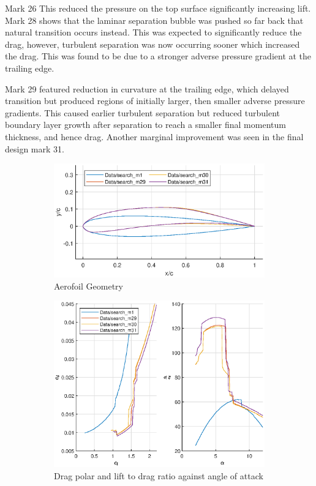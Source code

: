 \documentclass{article}
\begin{document}
Mark 26 
This reduced the pressure on the top surface significantly increasing lift.
Mark 28 shows that the laminar separation bubble was pushed so far back that natural transition occurs instead.
This was expected to significantly reduce the drag, however, turbulent separation was now occurring sooner which increased the drag.
This was found to be due to a stronger adverse pressure gradient at the trailing edge.

Mark 29 featured reduction in curvature at the trailing edge, which delayed transition but produced regions of initially larger, then smaller adverse pressure gradients.
This caused earlier turbulent separation but reduced turbulent boundary layer growth after separation to reach a smaller final momentum thickness, and hence drag.
Another marginal improvement was seen in the final design mark 31. 

\begin{figure}[H]
    \begin{subfigure}{0.54\textwidth}
        \centering
        \includegraphics[width=1.2\textwidth, center]{figures/loRe_geometry_31.eps}
        \caption{Aerofoil Geometry}
        \label{fig:m31_geometry}
    \end{subfigure}
    \begin{subfigure}{0.45\textwidth}
        \centering
        \includegraphics[width=1.2\textwidth, center]{figures/loRe_lod_31.eps}
        \caption{Drag polar and lift to drag ratio against angle of attack}
        \label{fig:m31_lod}
    \end{subfigure}
    \caption{}
\end{figure}
\end{document}
